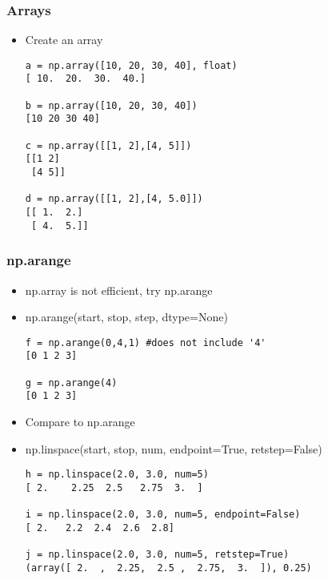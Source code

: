 \documentclass{beamer}
\begin{document}
\begin{frame}[fragile]
\frametitle{Arrays}
\begin{itemize}
\item Create an array
\begin{lstlisting}
a = np.array([10, 20, 30, 40], float)
[ 10.  20.  30.  40.]

b = np.array([10, 20, 30, 40])
[10 20 30 40]

c = np.array([[1, 2],[4, 5]])
[[1 2]
 [4 5]]

d = np.array([[1, 2],[4, 5.0]])
[[ 1.  2.]
 [ 4.  5.]]
\end{lstlisting}
\end{itemize}
\end{frame}

\begin{frame}[fragile]
\frametitle{np.arange}
\begin{itemize}
\item np.array is not efficient, try np.arange
\item np.arange(start, stop, step, dtype=None)
\begin{lstlisting}
f = np.arange(0,4,1) #does not include '4'
[0 1 2 3]

g = np.arange(4)
[0 1 2 3]
\end{lstlisting}
\end{itemize}
\end{frame}

\begin{frame}[fragile]
\begin{itemize}
\frametitle{np.linespace}
\item Compare to np.arange
\item np.linspace(start, stop, num, endpoint=True, retstep=False)
\begin{lstlisting}
h = np.linspace(2.0, 3.0, num=5)
[ 2.    2.25  2.5   2.75  3.  ]

i = np.linspace(2.0, 3.0, num=5, endpoint=False)
[ 2.   2.2  2.4  2.6  2.8]

j = np.linspace(2.0, 3.0, num=5, retstep=True)
(array([ 2.  ,  2.25,  2.5 ,  2.75,  3.  ]), 0.25)
\end{lstlisting}
\end{itemize}
\end{frame}
\end{document}
